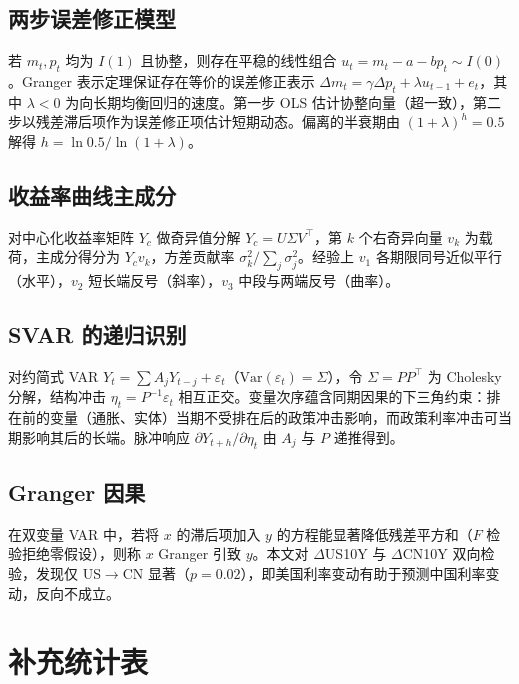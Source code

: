 \documentclass[12pt,a4paper]{ctexart}
\begin{document}
\subsection{两步误差修正模型}
若 $m_t,p_t$ 均为 $I(1)$ 且协整，则存在平稳的线性组合 $u_t=m_t-a-bp_t\sim I(0)$。Granger 表示定理保证存在等价的误差修正表示 $\Delta m_t = \gamma\Delta p_t + \lambda u_{t-1}+e_t$，其中 $\lambda<0$ 为向长期均衡回归的速度。第一步 OLS 估计协整向量（超一致），第二步以残差滞后项作为误差修正项估计短期动态。偏离的半衰期由 $(1+\lambda)^h=0.5$ 解得 $h=\ln 0.5/\ln(1+\lambda)$。

\subsection{收益率曲线主成分}
对中心化收益率矩阵 $Y_c$ 做奇异值分解 $Y_c=U\Sigma V^\top$，第 $k$ 个右奇异向量 $v_k$ 为载荷，主成分得分为 $Y_c v_k$，方差贡献率 $\sigma_k^2/\sum_j\sigma_j^2$。经验上 $v_1$ 各期限同号近似平行（水平），$v_2$ 短长端反号（斜率），$v_3$ 中段与两端反号（曲率）。

\subsection{SVAR 的递归识别}
对约简式 VAR $Y_t=\sum A_j Y_{t-j}+\varepsilon_t$（$\mathrm{Var}(\varepsilon_t)=\Sigma$），令 $\Sigma=PP^\top$ 为 Cholesky 分解，结构冲击 $\eta_t=P^{-1}\varepsilon_t$ 相互正交。变量次序蕴含同期因果的下三角约束：排在前的变量（通胀、实体）当期不受排在后的政策冲击影响，而政策利率冲击可当期影响其后的长端。脉冲响应 $\partial Y_{t+h}/\partial \eta_t$ 由 $A_j$ 与 $P$ 递推得到。

\subsection{Granger 因果}
在双变量 VAR 中，若将 $x$ 的滞后项加入 $y$ 的方程能显著降低残差平方和（$F$ 检验拒绝零假设），则称 $x$ Granger 引致 $y$。本文对 $\Delta$US10Y 与 $\Delta$CN10Y 双向检验，发现仅 US$\to$CN 显著（$p=0.02$），即美国利率变动有助于预测中国利率变动，反向不成立。

\section{补充统计表}
\end{document}
